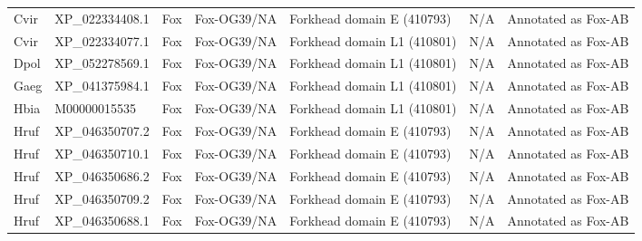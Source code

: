 \documentclass[../main.tex]{subfiles}
\begin{document}
\begin{landscape}
\begin{longtable}{lllllll}
		Cvir           & XP\_022334408.1       & Fox            & Fox-OG39/NA         & Forkhead domain E (410793)                  & N/A                                                                    & Annotated as Fox-AB  \\
		Cvir           & XP\_022334077.1       & Fox            & Fox-OG39/NA         & Forkhead domain L1 (410801)                 & N/A                                                                    & Annotated as Fox-AB  \\
		Dpol           & XP\_052278569.1       & Fox            & Fox-OG39/NA         & Forkhead domain L1 (410801)                 & N/A                                                                    & Annotated as Fox-AB  \\
		Gaeg           & XP\_041375984.1       & Fox            & Fox-OG39/NA         & Forkhead domain L1 (410801)                 & N/A                                                                    & Annotated as Fox-AB  \\
		Hbia           & M00000015535          & Fox            & Fox-OG39/NA         & Forkhead domain L1 (410801)                 & N/A                                                                    & Annotated as Fox-AB  \\
		Hruf           & XP\_046350707.2       & Fox            & Fox-OG39/NA         & Forkhead domain E (410793)                  & N/A                                                                    & Annotated as Fox-AB  \\
		Hruf           & XP\_046350710.1       & Fox            & Fox-OG39/NA         & Forkhead domain E (410793)                  & N/A                                                                    & Annotated as Fox-AB  \\
		Hruf           & XP\_046350686.2       & Fox            & Fox-OG39/NA         & Forkhead domain E (410793)                  & N/A                                                                    & Annotated as Fox-AB  \\
		Hruf           & XP\_046350709.2       & Fox            & Fox-OG39/NA         & Forkhead domain E (410793)                  & N/A                                                                    & Annotated as Fox-AB  \\
		Hruf           & XP\_046350688.1       & Fox            & Fox-OG39/NA         & Forkhead domain E (410793)                  & N/A                                                                    & Annotated as Fox-AB  \\

\end{longtable}
\end{landscape}
\end{document}
